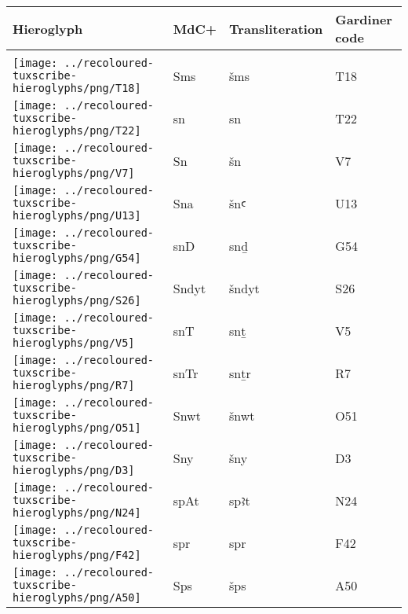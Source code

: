 \begin{center}
	\begin{tabularx}{\linewidth}{YYYY}
		Hieroglyph & MdC+ & Transliteration & Gardiner code\\
		\hline\\
		\texttt{[image: ../recoloured-tuxscribe-hieroglyphs/png/T18]} & Sms & šms & T18 \\ 
		\texttt{[image: ../recoloured-tuxscribe-hieroglyphs/png/T22]} & sn & sn & T22 \\ 
		\texttt{[image: ../recoloured-tuxscribe-hieroglyphs/png/V7]} & Sn & šn & V7 \\ 
		\texttt{[image: ../recoloured-tuxscribe-hieroglyphs/png/U13]} & Sna & šnꜥ & U13 \\ 
		\texttt{[image: ../recoloured-tuxscribe-hieroglyphs/png/G54]} & snD & snḏ & G54 \\ 
		\texttt{[image: ../recoloured-tuxscribe-hieroglyphs/png/S26]} & Sndyt & šndyt & S26 \\ 
		\texttt{[image: ../recoloured-tuxscribe-hieroglyphs/png/V5]} & snT & snṯ & V5 \\ 
		\texttt{[image: ../recoloured-tuxscribe-hieroglyphs/png/R7]} & snTr & snṯr & R7 \\ 
		\texttt{[image: ../recoloured-tuxscribe-hieroglyphs/png/O51]} & Snwt & šnwt & O51 \\ 
		\texttt{[image: ../recoloured-tuxscribe-hieroglyphs/png/D3]} & Sny & šny & D3 \\ 
		\texttt{[image: ../recoloured-tuxscribe-hieroglyphs/png/N24]} & spAt & spꜣt & N24 \\ 
		\texttt{[image: ../recoloured-tuxscribe-hieroglyphs/png/F42]} & spr & spr & F42 \\ 
		\texttt{[image: ../recoloured-tuxscribe-hieroglyphs/png/A50]} & Sps & šps & A50 \\ 
	\end{tabularx}
\end{center}



